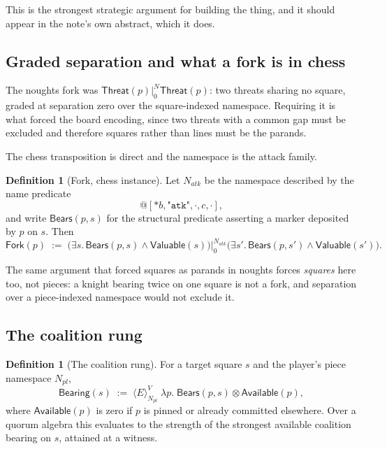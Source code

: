 \documentclass[11pt,a4paper]{article}
\makeatletter
\theoremstyle{plain}
\theoremstyle{definition}
\newtheorem{definition}[theorem]{Definition}
\theoremstyle{remark}
\newcommand{\qt}[1]{\ensuremath{@#1}}
\newcommand{\Emod}[2]{\langle E\rangle^{#2}_{#1}}
\newcommand{\gsep}[2]{\mathbin{|_{#1}^{#2}}}
\makeatother
\begin{document}
This is the strongest strategic argument for building the thing, and it should
appear in the note's own abstract, which it does.

\subsection{Graded separation and what a fork is in chess}

The noughts fork was $\mathsf{Threat}(p) \gsep{0}{N} \mathsf{Threat}(p)$: two
threats sharing no square, graded at separation zero over the square-indexed
namespace. Requiring it is what forced the board encoding, since two threats
with a common gap must be excluded and therefore squares rather than lines must
be the parands.

The chess transposition is direct and the namespace is the attack family.

\begin{definition}[Fork, chess instance]
\label{def:fork}
Let $N_{\mathit{atk}}$ be the namespace described by the name predicate
\[
  \qt{[*b,\texttt{"atk"},\cdot,c,\cdot]},
\]
and write $\mathsf{Bears}(p,s)$ for the structural predicate asserting a marker
deposited by $p$ on $s$. Then
\[
  \mathsf{Fork}(p) \;:=\;
  \big(\exists s.\,\mathsf{Bears}(p,s) \wedge \mathsf{Valuable}(s)\big)
  \gsep{0}{N_{\mathit{atk}}}
  \big(\exists s'.\,\mathsf{Bears}(p,s') \wedge \mathsf{Valuable}(s')\big).
\]
\end{definition}

The same argument that forced squares as parands in noughts forces
\emph{squares} here too, not pieces: a knight bearing twice on one square is not
a fork, and separation over a piece-indexed namespace would not exclude it.

\subsection{The coalition rung}

\begin{definition}[The coalition rung]
\label{def:coalrung}
For a target square $s$ and the player's piece namespace $N_{\mathit{pl}}$,
\[
  \mathsf{Bearing}(s) \;:=\;
  \Emod{N_{\mathit{pl}}}{V}\; \lambda p.\;\mathsf{Bears}(p,s)
  \otimes \mathsf{Available}(p),
\]
where $\mathsf{Available}(p)$ is zero if $p$ is pinned or already committed
elsewhere. Over a quorum algebra this evaluates to the strength of the strongest
available coalition bearing on $s$, attained at a witness.
\end{definition}
\end{document}
